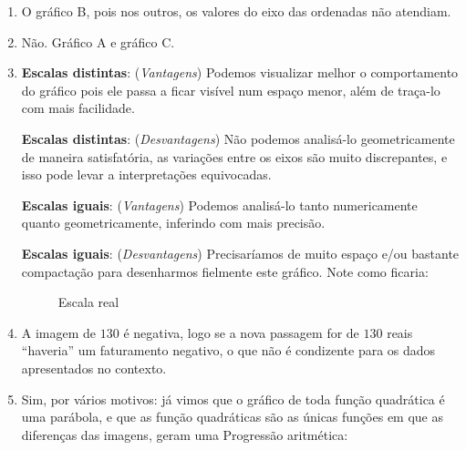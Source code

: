 \documentclass[10 pt,usenames,dvipsnames, oneside]{article}
\begin{document}
\begin{solucao}
\begin{enumerate}
\item {} 
O gráfico B, pois nos outros, os valores do eixo das ordenadas não atendiam.

\item {} 
Não. Gráfico A e gráfico C.

\item {} 
\textbf{Escalas distintas}: (\textit{Vantagens}) Podemos visualizar melhor o comportamento do gráfico pois ele passa a ficar visível num espaço menor, além de traça-lo com mais facilidade.

\textbf{Escalas distintas}: (\textit{Desvantagens}) Não podemos analisá-lo geometricamente de maneira satisfatória, as variações entre os eixos são muito discrepantes, e isso pode levar a interpretações equivocadas.

\textbf{Escalas iguais}: (\textit{Vantagens}) Podemos analisá-lo tanto numericamente quanto geometricamente, inferindo com mais precisão.

\textbf{Escalas iguais}: (\textit{Desvantagens}) Precisaríamos de muito espaço e/ou bastante compactação para desenharmos fielmente este gráfico. Note como ficaria:

\begin{figure}[H]
\centering

\caption{Escala real}
\end{figure}

\item {} 
A imagem de \(130\) é negativa, logo se a nova passagem for de \(130\) reais “haveria” um faturamento negativo, o que não é condizente para os dados apresentados no contexto.

\item {} 
Sim, por vários motivos: já vimos que o gráfico de toda função quadrática é uma parábola, e que as função quadráticas são as únicas funções em que as diferenças das imagens, geram uma Progressão aritmética:


\end{enumerate}
\end{solucao}
\end{document}
